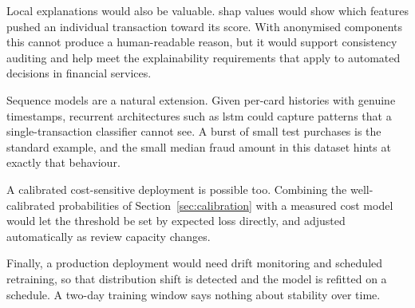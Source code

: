 Local explanations would also be valuable. \gls{shap} values \citep{lundberg2017unified}
would show which
features pushed an individual transaction toward its score. With anonymised components this
cannot produce a human-readable reason, but it would support consistency auditing and help
meet the explainability requirements that apply to automated decisions in financial
services.

Sequence models are a natural extension. Given per-card histories with genuine timestamps, recurrent
architectures such as \gls{lstm} \citep{hochreiter1997long} could capture patterns that a
single-transaction classifier cannot see. A burst of small test purchases is the standard
example, and the small median fraud amount in this dataset hints at exactly that behaviour.

A calibrated cost-sensitive deployment is possible too. Combining the well-calibrated
probabilities of Section~\ref{sec:calibration} with a measured cost model would let the
threshold be set by expected loss directly, and adjusted automatically as review capacity
changes.

Finally, a production deployment would need drift monitoring and scheduled retraining, so
that distribution shift is detected and the model is refitted on a schedule. A two-day
training window says nothing about stability over time.
